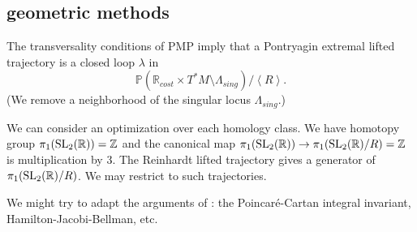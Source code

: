 \documentclass{article}
\theoremstyle{remark}
\newcommand{\ring}[1]{\mathbb{#1}}
\newcommand{\op}[1]{\hbox{#1}}
\newcommand{\ang}[1]{\left\langle{#1}\right\rangle}
\def\SL{\op{SL}_2(\ring{R})}
\newcommand\Lsing{\Lambda_{sing}}
\begin{document}
\subsection{geometric methods}

The transversality conditions of PMP imply that a Pontryagin extremal
lifted trajectory is a closed loop $\lambda$ in 
\[
\ring{P}(\ring{R}_{cost} \times T^*M \setminus \Lsing)/\ang{R}.
\]
  (We remove a neighborhood of the singular locus $\Lsing$.)

We can consider an optimization over each homology class.
We have homotopy group $\pi_1(\SL)=\ring{Z}$ and the canonical map
$\pi_1(\SL)\to \pi_1(\SL/R)=\ring{Z}$ is multiplication by $3$.  The
Reinhardt lifted trajectory gives a generator of $\pi_1(\SL/R)$.  We
may restrict to such trajectories.

We might try to adapt the arguments of \cite[Chapter
17]{agrachev2013control}: the Poincar\'e-Cartan integral invariant,
Hamilton-Jacobi-Bellman, etc.


 

\end{document}
